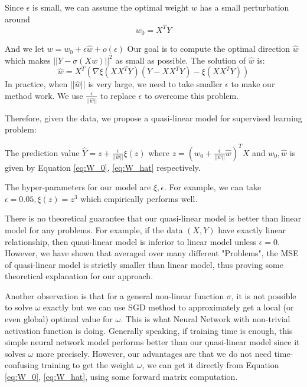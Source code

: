 \documentclass{article}
\begin{document}
Since $\epsilon$ is small, we can assume the optimal weight $w$ has a small perturbation around
\begin{equation}\label{eq:W_0}
w_0 = X^T Y
\end{equation}


And we let $w=w_0 + \epsilon \hat{w} + o(\epsilon)$ Our goal is to compute the optimal direction $\hat{w}$ which makes
$||Y-\sigma(Xw)||^2$ as small as possible.
The solution of $\hat{w}$ is:
\begin{equation}\label{eq:W_hat}
\hat{w} = X^T\left(\nabla \xi(XX^TY)(Y-XX^TY) - \xi(XX^TY)
\right)
\end{equation}
In practice, when $||\hat{w}||$ is very large, we need to take smaller $\epsilon$ to make our method work. We use 
$\frac{\epsilon}{||\hat{w}||} $ to replace $\epsilon$ to overcome this problem.

Therefore, given the data, we propose a quasi-linear model for supervised learning problem:

The prediction value $\hat{Y} = z + \frac{\epsilon}{||\hat{w}||} \xi(z) $ where $z = (w_0 + \frac{\epsilon}{||\hat{w}||} \hat{w})^T X$ and $w_0, \hat{w}$ is given by
Equation \eqref{eq:W_0}, \eqref{eq:W_hat} respectively.

The hyper-parameters for our model are $\xi, \epsilon$. For example, we can take $\epsilon = 0.05, \xi(z) = z^3$ which empirically performs well.

There is no theoretical guarantee that our quasi-linear model is better than linear model for any problems. For example, if the data $(X,Y)$ have exactly
linear relationship, then quasi-linear model is inferior to linear model unless $\epsilon = 0$. However, we have shown that averaged over many different "Problems",
the MSE of quasi-linear model is strictly smaller than linear model, thus proving some theoretical explanation for our approach.

Another observation is that for a general non-linear function $\sigma$, it is not possible to solve $\omega$ exactly but we can use SGD method
to approximately get a local (or even global) optimal value for $\omega$. This is what Neural Network with non-trivial activation function is doing.
Generally speaking, if training time is enough, this simple neural network model performs better than our quasi-linear model since it solves $\omega$ more precisely.
However, our advantages are that we do not need time-confusing training to get the weight $\omega$, we can get it directly from Equation \eqref{eq:W_0}, \eqref{eq:W_hat}, using some forward matrix computation.
\end{document}
